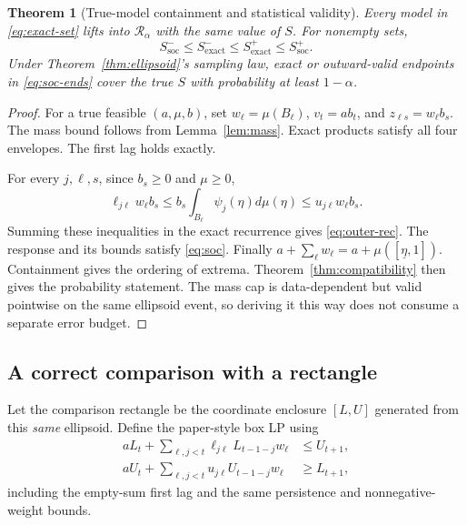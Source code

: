 \documentclass[11pt,a4paper]{article}
\newtheorem{theorem}{Theorem}[section]
\theoremstyle{definition}\newtheorem{definition}[theorem]{Definition}
\theoremstyle{remark}\newtheorem{remark}[theorem]{Remark}
\newcommand{\mc}{\mathcal}
\begin{document}
\begin{theorem}[True-model containment and statistical validity]\label{thm:soc}
Every model in \eqref{eq:exact-set} lifts into $\mc R_\alpha$ with the same value of $S$. For nonempty sets,
\begin{equation}
 S_{\mathrm{soc}}^-\le S_{\mathrm{exact}}^-\le S_{\mathrm{exact}}^+\le S_{\mathrm{soc}}^+.
 \label{eq:contain}
\end{equation}
Under Theorem~\ref{thm:ellipsoid}'s sampling law, exact or outward-valid endpoints in \eqref{eq:soc-ends} cover the true $S$ with probability at least $1-\alpha$.
\end{theorem}
\begin{proof}
For a true feasible $(a,\mu,b)$, set $w_\ell=\mu(B_\ell)$, $v_t=ab_t$, and $z_{\ell s}=w_\ell b_s$. The mass bound follows from Lemma~\ref{lem:mass}. Exact products satisfy all four envelopes. The first lag holds exactly.

For every $j,\ell,s$, since $b_s\ge0$ and $\mu\ge0$,
\[
 \ell_{j\ell}w_\ell b_s
 \le b_s\int_{B_\ell}\psi_j(\eta)d\mu(\eta)
 \le u_{j\ell}w_\ell b_s.
\]
Summing these inequalities in the exact recurrence gives \eqref{eq:outer-rec}. The response and its bounds satisfy \eqref{eq:soc}. Finally
$a+\sum_\ell w_\ell=a+\mu([\underline\eta,1])$.
Containment gives the ordering of extrema. Theorem~\ref{thm:compatibility} then gives the probability statement. The mass cap is data-dependent but valid pointwise on the same ellipsoid event, so deriving it this way does not consume a separate error budget.
\end{proof}

\subsection{A correct comparison with a rectangle}
Let the comparison rectangle be the coordinate enclosure $[L,U]$ generated from this \emph{same} ellipsoid. Define the paper-style box LP using
\begin{align}
 aL_t+\sum_{\ell,j<t}\ell_{j\ell}L_{t-1-j}w_\ell&\le U_{t+1},\label{eq:boxlower}\\
 aU_t+\sum_{\ell,j<t}u_{j\ell}U_{t-1-j}w_\ell&\ge L_{t+1},\label{eq:boxupper}
\end{align}
including the empty-sum first lag and the same persistence and nonnegative-weight bounds.
\end{document}
